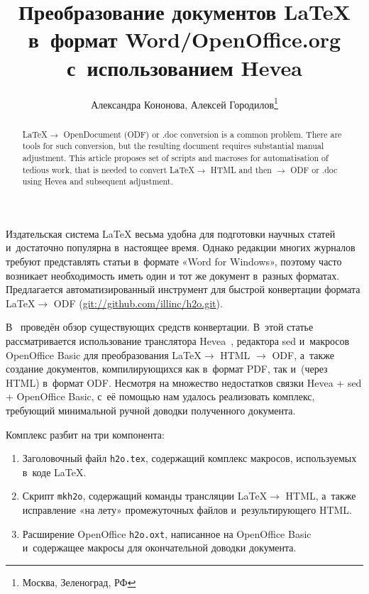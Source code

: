 \documentclass[10pt, a5paper]{article}
\begin{document}
\title{Преобразование документов \LaTeX{} в~формат Word/OpenOffice.org с~использованием Hevea}%

\author{Александра Кононова, Алексей Городилов\footnote{Москва, Зеленоград, РФ}}
\maketitle

\begin{abstract}
\LaTeX $\to$ OpenDocument (ODF) or .doc conversion is a common problem. 
There are tools for such conversion, but the resulting document requires 
substantial manual adjustment. This article proposes set of scripts and 
macroses for automatisation of tedious work, that is needed to convert 
\LaTeX $\to$ HTML and then $\to$ ODF or .doc  using Hevea and subsequent 
adjustment.
\end{abstract}

Издательская система \LaTeX{} весьма удобна для подготовки научных статей и~достаточно популярна в~настоящее время.
Однако редакции многих журналов требуют представлять статьи в~формате «Word for Windows»,
поэтому часто
возникает необходимость иметь один и тот же документ в~разных форматах.
Предлагается автоматизированный инструмент для быстрой конвертации формата \LaTeX $\to$ ODF (\url{git://github.com/illinc/h2o.git}).

В~\cite{h2o:virens:latex-word-openoffice} проведён обзор существующих средств конвертации.
В~этой статье рассматривается использование транслятора Hevea~\cite{h2o:hevea.inria.fr}, редактора sed и~макросов OpenOffice Basic для преобразования \LaTeX $\to$ HTML $\to$ ODF, а~также создание документов, компилирующихся как в~формат PDF, так и~(через HTML) в~формат ODF.
Несмотря на множество недостатков связки Hevea + sed + OpenOffice Basic, с~её помощью нам удалось реализовать комплекс, требующий минимальной ручной доводки полученного документа.

Комплекс разбит на три компонента:
\begin{enumerate}
\item Заголовочный файл \verb!h2o.tex!, содержащий комплекс макросов, используемых в~коде \LaTeX.
\item Скрипт \verb!mkh2o!, содержащий команды трансляции \LaTeX $\to$ HTML, а~также исправление «на лету» промежуточных файлов и~результирующего HTML.
\item Расширение OpenOffice \verb!h2o.oxt!, написанное на OpenOffice Basic и~содержащее макросы для окончательной доводки документа.
\end{enumerate}
\end{document}
